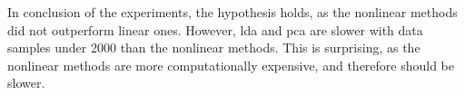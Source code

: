 In conclusion of the experiments, the hypothesis holds, as the nonlinear methods did not outperform linear ones. However, \gls{lda} and \gls{pca} are slower with data samples under 2000 than the nonlinear methods. This is surprising, as the nonlinear methods are more computationally expensive, and therefore should be slower. 








